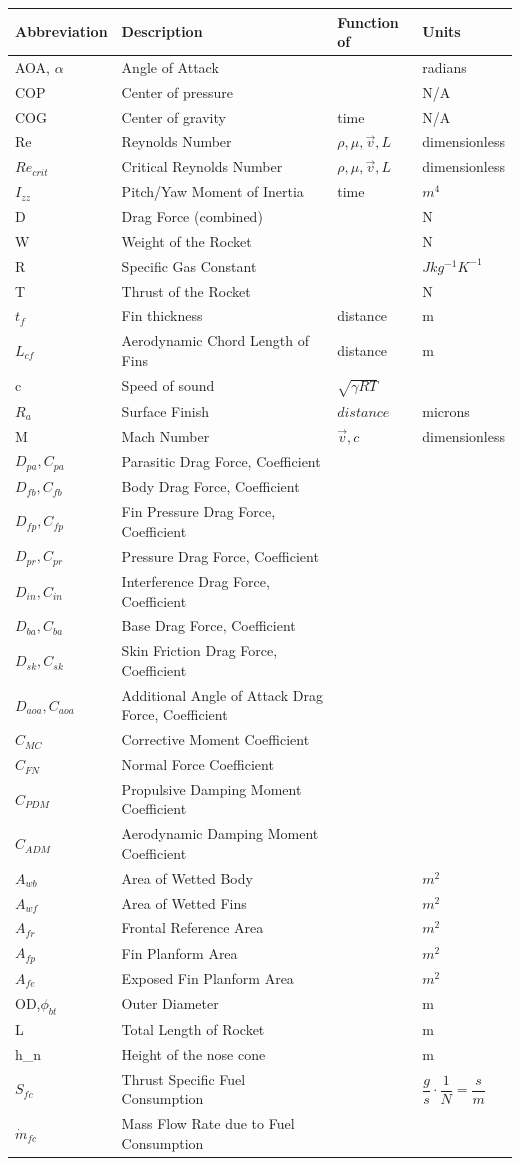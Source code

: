 \documentclass[]{book}
\begin{document}
\begin{longtable}[c]{@{}llll@{}}
\toprule
Abbreviation & Description & Function of & Units\tabularnewline
\midrule
\endhead
AOA, \(\alpha\) & Angle of Attack & & radians\tabularnewline
COP & Center of pressure & & N/A\tabularnewline
COG & Center of gravity & time & N/A\tabularnewline
Re & Reynolds Number & \( \rho,\mu,\vec{v},L \) &
dimensionless\tabularnewline
\(Re_{crit}\) & Critical Reynolds Number & \( \rho,\mu,\vec{v},L \) &
dimensionless\tabularnewline
\(I_{zz}\) & Pitch/Yaw Moment of Inertia & time & \(m^4\)\tabularnewline
D & Drag Force (combined) & & N\tabularnewline
W & Weight of the Rocket & & N\tabularnewline
R & Specific Gas Constant & & \(J kg^{-1} K^{-1}\)\tabularnewline
T & Thrust of the Rocket & & N\tabularnewline
\(t_f\) & Fin thickness & distance & m\tabularnewline
\(L_{cf}\) & Aerodynamic Chord Length of Fins & distance &
m\tabularnewline
c & Speed of sound & \( \sqrt{\gamma RT} \) &\tabularnewline
\(R_a\) & Surface Finish & \( distance \) & microns\tabularnewline
M & Mach Number & \( \vec{v}, c \) & dimensionless\tabularnewline
\(D_{pa}, C_{pa}\) & Parasitic Drag Force, Coefficient &
&\tabularnewline
\(D_{fb}, C_{fb}\) & Body Drag Force, Coefficient & &\tabularnewline
\(D_{fp}, C_{fp}\) & Fin Pressure Drag Force, Coefficient &
&\tabularnewline
\(D_{pr}, C_{pr}\) & Pressure Drag Force, Coefficient & &\tabularnewline
\(D_{in}, C_{in}\) & Interference Drag Force, Coefficient &
&\tabularnewline
\(D_{ba}, C_{ba}\) & Base Drag Force, Coefficient & &\tabularnewline
\(D_{sk}, C_{sk}\) & Skin Friction Drag Force, Coefficient &
&\tabularnewline
\(D_{aoa}, C_{aoa}\) & Additional Angle of Attack Drag Force,
Coefficient & &\tabularnewline
\(C_{MC}\) & Corrective Moment Coefficient & &\tabularnewline
\(C_{FN}\) & Normal Force Coefficient & &\tabularnewline
\(C_{PDM}\) & Propulsive Damping Moment Coefficient & &\tabularnewline
\(C_{ADM}\) & Aerodynamic Damping Moment Coefficient & &\tabularnewline
\(A_{wb}\) & Area of Wetted Body & & \(m^2\)\tabularnewline
\(A_{wf}\) & Area of Wetted Fins & & \(m^2\)\tabularnewline
\(A_{fr}\) & Frontal Reference Area & & \(m^2\)\tabularnewline
\(A_{fp}\) & Fin Planform Area & & \(m^2\)\tabularnewline
\(A_{fe}\) & Exposed Fin Planform Area & & \(m^2\)\tabularnewline
OD,\(\phi_{bt}\) & Outer Diameter & & m\tabularnewline
L & Total Length of Rocket & & m\tabularnewline
h\_n & Height of the nose cone & & m\tabularnewline
\(S_{fc}\) & Thrust Specific Fuel Consumption & &
\(\dfrac{g}{s}\cdot \dfrac{1}{N} = \dfrac{s}{m}\)\tabularnewline
\(\dot{m}_{fc}\) & Mass Flow Rate due to Fuel Consumption & &

\end{longtable}
\end{document}

